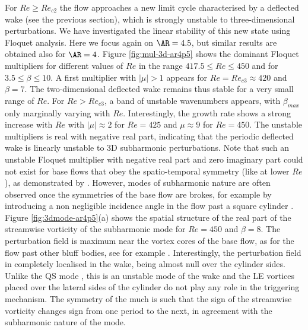 For $Re \ge Re_{c2}$ the flow approaches a new limit cycle characterised by a deflected wake (see the previous section), which is strongly unstable to three-dimensional perturbations. We have investigated the linear stability of this new state using Floquet analysis. Here we focus again on $\AR=4.5$, but similar results are obtained also for $\AR=4$. Figure \ref{fig:mul-3d-ar4p5} shows the dominant Floquet multipliers for different values of $Re$ in the range $417.5 \le Re \le 450$ and for $3.5 \le \beta \le 10$. A first multiplier with $|\mu|>1$ appears for $Re = Re_{c3} \approx 420$ and $\beta=7$. The two-dimensional deflected wake remains thus stable for a very small range of $Re$. For $Re > Re_{c3}$, a band of unstable wavenumbers appears, with $\beta_{max}$ only marginally varying with $Re$. Interestingly, the growth rate shows a strong increase with $Re$ with $|\mu| \approx 2$ for $Re=425$ and $\mu\approx 9$ for $Re=450$. The unstable multipliers is real with negative real part, indicating that the periodic deflected wake is linearly unstable to 3D subharmonic perturbations. Note that such an unstable Floquet multiplier with negative real part and zero imaginary part could not exist for base flows that obey the spatio-temporal symmetry (like at lower $Re$), as demonstrated by \cite{marques-lopez-blackburn-2004,blackburn-etal-2005}. However, modes of subharmonic nature are often observed once the symmetries of the base flow are brokes, for example by introducing a non negligible incidence angle in the flow past a square cylinder \citep{blackburn-sheard-2010}.
%
Figure \ref{fig:3dmode-ar4p5}(a) shows the spatial structure of the real part of the streamwise vorticity of the subharmonic mode for $Re=450$ and $\beta=8$. The perturbation field is maximum near the vortex cores of the base flow, as for the flow past other bluff bodies, see for example \cite{thompson-leweke-williamson-2001,chaurasia-thompson-2011}. Interestingly, the perturbation field in completely localised in the wake, being almost null over the cylinder sides. Unlike the QS mode \citep{chiarini-quadrio-auteri-2022d}, this is an unstable mode of the wake and the LE vortices placed over the lateral sides of the cylinder do not play any role in the triggering mechanism. The symmetry of the much is such that the sign of the streamwise vorticity changes sign from one period to the next, in agreement with the subharmonic nature of the mode.

